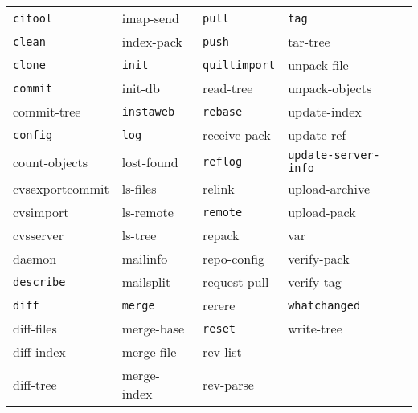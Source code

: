 \documentclass[english]{beamer}
\newcommand{\CMD}[1]{
  \texttt{\textcolor{code-green}{#1}}
}
\newcommand{\cmd}[1]{
  \texttt{\textcolor{code-orange}{#1}}
}
\newcommand{\gui}[1]{
  \texttt{\textcolor{code-blue}{#1}}
}
\begin{document}
\begin{frame}[fragile]
{{\begin{tabular}{llll}
\gui{citool}           &      imap-send         & \CMD{pull}          & \CMD{tag}               \\
\CMD{clean}            &      index-pack        & \CMD{push}          &      tar-tree           \\
\CMD{clone}            & \CMD{init}             & \cmd{quiltimport}   &      unpack-file        \\
\CMD{commit}           &      init-db           &      read-tree      &      unpack-objects     \\
     commit-tree       & \cmd{instaweb}         & \CMD{rebase}        &      update-index       \\
\CMD{config}           & \CMD{log}              &      receive-pack   &      update-ref         \\
     count-objects     &      lost-found        & \cmd{reflog}        & \cmd{update-server-info}\\
     cvsexportcommit   &      ls-files          &      relink         &      upload-archive     \\
     cvsimport         &      ls-remote         & \CMD{remote}        &      upload-pack        \\
     cvsserver         &      ls-tree           &      repack         &      var                \\
     daemon            &      mailinfo          &      repo-config    &      verify-pack        \\
\cmd{describe}         &      mailsplit         &      request-pull   &      verify-tag         \\
\CMD{diff}             & \CMD{merge}            &      rerere         & \cmd{whatchanged}       \\
     diff-files        &      merge-base        & \CMD{reset}         &      write-tree         \\
     diff-index        &      merge-file        &      rev-list       &                         \\
     diff-tree         &      merge-index       &      rev-parse      &                         \\
\end{tabular}
}}
\end{frame}
\end{document}

